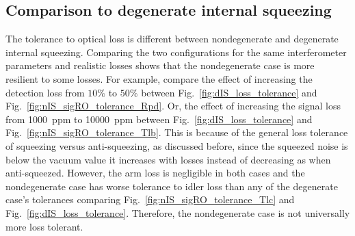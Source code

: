 \subsection{Comparison to degenerate internal squeezing}

The tolerance to optical loss is different between nondegenerate and degenerate internal squeezing. Comparing the two configurations for the same interferometer parameters and realistic losses shows that the nondegenerate case is more resilient to some losses. For example, compare the effect of increasing the detection loss from $10\%$ to $50\%$ between Fig.~\ref{fig:dIS_loss_tolerance} and Fig.~\ref{fig:nIS_sigRO_tolerance_Rpd}. Or, the effect of increasing the signal loss from 1000~ppm to 10000~ppm between Fig.~\ref{fig:dIS_loss_tolerance} and Fig.~\ref{fig:nIS_sigRO_tolerance_Tlb}. 
This is because of the general loss tolerance of squeezing versus anti-squeezing, as discussed before, since the squeezed noise is below the vacuum value it increases with losses instead of decreasing as when anti-squeezed. %
However, the arm loss is negligible in both cases and the nondegenerate case has worse tolerance to idler loss than any of the degenerate case's tolerances comparing Fig.~\ref{fig:nIS_sigRO_tolerance_Tlc} and Fig.~\ref{fig:dIS_loss_tolerance}. Therefore, the nondegenerate case is not universally more loss tolerant.
